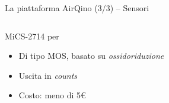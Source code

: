\begin{frame}[t]{La piattaforma AirQino (3/3) – Sensori}
\begin{columns}

\begin{column}{0.5\textwidth}
\begin{center}

\begin{block}{MiCS-2714 per }
\begin{figure}[H]
    \centering
\end{figure}
\vspace{0.1cm}
\begin{itemize}
  \item Di tipo MOS, basato su \textit{ossidoriduzione}
  \item Uscita in \textit{counts}
  \item Costo: meno di 5€
\end{itemize}
\vspace{0.1cm}

\end{block}

\end{center}
\end{column}


\end{columns}
\end{frame}

